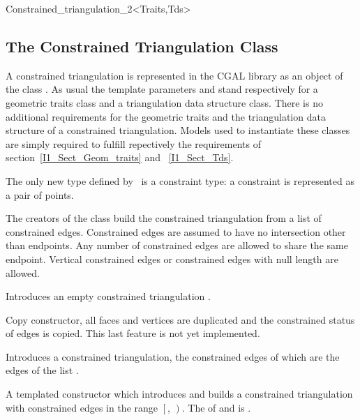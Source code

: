 \begin{ccClassTemplate} {Constrained_triangulation_2<Traits,Tds>}
\subsection{ The Constrained Triangulation  Class}
A constrained triangulation is represented in the CGAL library as an
object of the class \ccClassTemplateName .
As usual the template parameters  and 
stand respectively for a geometric traits class and
a triangulation data structure class. There is no additional
requirements for the geometric traits and the triangulation data
structure of a constrained triangulation.
Models used to instantiate these classes are simply required
to fulfill repectively the requirements 
of section~\ref{I1_Sect_Geom_traits} and ~\ref{I1_Sect_Tds}.

 
\ccInheritsFrom


\ccTypes
{}
\ccThreeToTwo
The only new type defined by
\ccClassTemplateName\ is a constraint type: a
constraint is represented as a pair of points.


\ccCreation
{}

The creators of the class build the constrained triangulation from a
list of constrained edges. Constrained edges are assumed to have no
intersection other than endpoints. Any number of constrained edges are
allowed to share the same endpoint.  Vertical constrained edges or
constrained edges with null length are allowed.

{Introduces an empty constrained triangulation \ccVar.}

 {Copy constructor, all faces and vertices
are duplicated and  the constrained status of edges
is copied. This last feature is not yet implemented.}

{Introduces a constrained triangulation, the constrained edges of which
are the edges of the list .}


{A templated constructor which introduces and builds
 a constrained triangulation with constrained edges in the range 
$\left[\right.$, $\left.\right)$.
\ccPrecond The  of  and 
 is .}



\end{ccClassTemplate}
